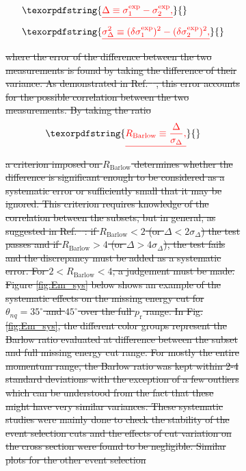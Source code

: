 \documentclass[aps, prl]{revtex4-2}  %
\providecommand{\DIFdeltex}[1]{{\protect\color{red}\sout{#1}}}                      %
\providecommand{\DIFdel}[1]{\texorpdfstring{\DIFdeltex{#1}}{}} %
\begin{document}
\begin{figure}[!h]
\begin{figure}[!h]
{}%
\begin{align*}
    &\DIFdel{\Delta \equiv \sigma^{\mathrm{exp}}_{\mathrm{1}} - \sigma^{\mathrm{exp}}_{\mathrm{2}}, }\\
    &\DIFdel{\sigma^{2}_{\Delta} \equiv (\delta\sigma^{\mathrm{exp}}_{\mathrm{1}})^{2} - (\delta\sigma^{\mathrm{exp}}_{\mathrm{2}})^{2},
  }\end{align*}%
\DIFdel{where the error of the difference between the two measurements is found by taking the difference of their variance. As demonstrated in Ref.\mbox{%
\cite{barlow2002systematic}}\hspace{0pt}%
, this
error accounts for the possible correlation between the two measurements. By taking the ratio
}\begin{displaymath}
  \DIFdel{R_{\mathrm{Barlow}} \equiv \frac{\Delta}{\sigma_{\Delta}},
}\end{displaymath}%
\DIFdel{a criterion imposed on $R_{\mathrm{Barlow}}$ determines whether the difference is significant enough to be considered as a systematic error or sufficiently small that it may be
ignored. This criterion requires knowledge of the correlation between the subsets, but in general, as suggested in Ref.\mbox{%
\cite{barlow2017}}\hspace{0pt}%
: if $R_{\mathrm{Barlow}} < 2$ (or $\Delta <2\sigma_{\Delta}$)
the test passes and if $R_{\mathrm{Barlow}} > 4$ (or $\Delta >4\sigma_{\Delta}$), the test fails and the discrepancy must be added as a systematic error. For $2<R_{\mathrm{Barlow}}<4$, a judgement must be made.}%
\DIFdel{Figure \ref{fig:Em_sys} below shows an example of the systematic effects on the missing energy cut for $\theta_{nq}=35^{\circ}$ and $45^{\circ}$ over the full $p_{\mathrm{r}}$ range.
In Fig. \ref{fig:Em_sys}, the different color groups represent the Barlow ratio evaluated at difference between the subset and full missing energy cut range. For mostly the entire momentum range,
the Barlow ratio was kept within 2-4 standard deviations with the exception of a few outliers which can be understood from the fact that these might have very similar variances. These systematic
studies were mainly done to check the stability of the event selection cuts and the effects of cut variation on the cross section were found to be negligible. Similar plots for the other event selection
}
\end{figure}
\end{figure}
\end{document}
